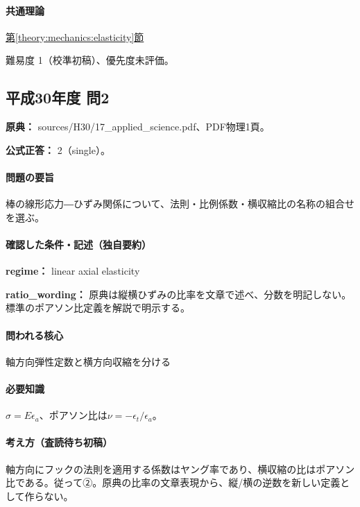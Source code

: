 \paragraph{共通理論} \hyperref[theory:mechanics:elasticity]{第\ref*{theory:mechanics:elasticity}節}

\par 難易度 1（校準初稿）、優先度未評価。

\subsection{平成30年度 問2}
\label{q:h30-reg-applied-02}

\noindent\textbf{原典：} sources/H30/17\_applied\_science.pdf、PDF物理1頁。

\textbf{公式正答：} 2（single）。

\paragraph{問題の要旨} 棒の線形応力―ひずみ関係について、法則・比例係数・横収縮比の名称の組合せを選ぶ。

\paragraph{確認した条件・記述（独自要約）}\mbox{}\par

\noindent\textbf{regime：} linear axial elasticity\par

\noindent\textbf{ratio\_wording：} 原典は縦横ひずみの比率を文章で述べ、分数を明記しない。標準のポアソン比定義を解説で明示する。\par

\paragraph{問われる核心} 軸方向弾性定数と横方向収縮を分ける

\paragraph{必要知識} \(\sigma=E\epsilon_a\)、ポアソン比は\(\nu=-\epsilon_t/\epsilon_a\)。

\paragraph{考え方（査読待ち初稿）} 軸方向にフックの法則を適用する係数はヤング率であり、横収縮の比はポアソン比である。従って②。原典の比率の文章表現から、縦/横の逆数を新しい定義として作らない。

